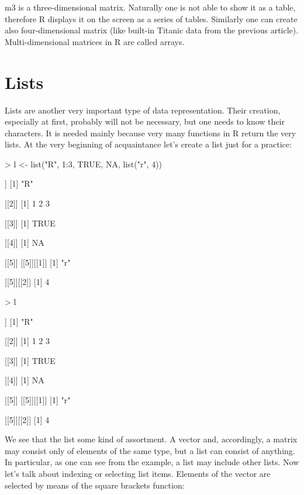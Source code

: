 \documentclass[a4paper,11pt]{scrartcl}
\begin{document}
m3 is a three-dimensional matrix. Naturally one is not able to show it as a table, therefore R displays it on the screen as a series of tables. Similarly one can create also four-dimensional matrix (like built-in Titanic data from the previous article). Multi-dimensional matrices in R are called arrays.

\section{Lists}
\label{sec:lists}

Lists are another very important type of data representation. Their creation, especially at first, probably will not be necessary, but one needs to know their characters. It is needed mainly because very many functions in R return the very lists. At the very beginning of acquaintance let’s create a list just for a practice:

\begin{Schunk}
\begin{Sinput}
> l <- list("R", 1:3, TRUE, NA, list("r", 4))
\end{Sinput}
\begin{Soutput}
[[1]]
[1] "R"

[[2]]
[1] 1 2 3

[[3]]
[1] TRUE

[[4]]
[1] NA

[[5]]
[[5]][[1]]
[1] "r"

[[5]][[2]]
[1] 4
\end{Soutput}
\begin{Sinput}
> l
\end{Sinput}
\begin{Soutput}
[[1]]
[1] "R"

[[2]]
[1] 1 2 3

[[3]]
[1] TRUE

[[4]]
[1] NA

[[5]]
[[5]][[1]]
[1] "r"

[[5]][[2]]
[1] 4
\end{Soutput}
\end{Schunk}

We see that the list some kind of assortment. A vector and, accordingly, a matrix may consist only of elements of the same type, but a list can consist of anything. In particular, as one can see from the example, a list may include other lists. Now let's talk about indexing or selecting list items. Elements of the vector are selected by means of the square brackets function:
\end{document}
